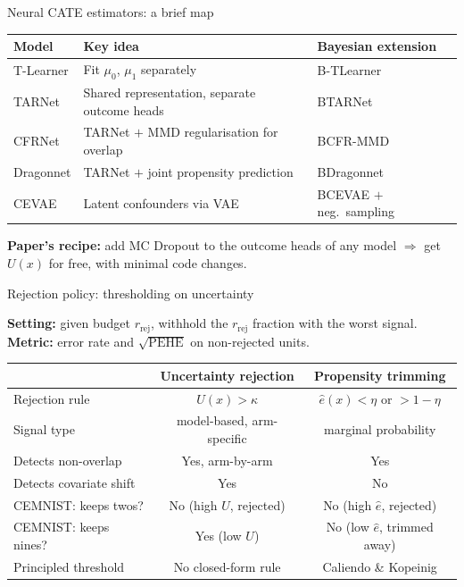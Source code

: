 \documentclass[aspectratio=169]{beamer}
\begin{document}
\begin{frame}{Neural CATE estimators: a brief map}

\begin{center}
\small
\renewcommand{\arraystretch}{1.3}
\begin{tabular}{lll}
\toprule
Model      & Key idea                                        & Bayesian extension \\
\midrule
T-Learner  & Fit $\mu_0$, $\mu_1$ separately                 & B-TLearner \\
TARNet     & Shared representation, separate outcome heads   & BTARNet \\
CFRNet     & TARNet $+$ MMD regularisation for overlap       & BCFR-MMD \\
Dragonnet  & TARNet $+$ joint propensity prediction          & BDragonnet \\
CEVAE      & Latent confounders via VAE                      & BCEVAE $+$ neg.\ sampling \\
\bottomrule
\end{tabular}
\end{center}

\bigskip
\textbf{Paper's recipe:} add MC Dropout to the outcome heads of any model
$\Rightarrow$ get $U(x)$ for free, with minimal code changes.
\end{frame}

\begin{frame}{Rejection policy: thresholding on uncertainty}

\textbf{Setting:} given budget $r_{\mathrm{rej}}$, withhold the
$r_{\mathrm{rej}}$ fraction with the worst signal.
\textbf{Metric:} error rate and $\sqrt{\mathrm{PEHE}}$ on non-rejected units.

\medskip
\begin{center}
\small
\renewcommand{\arraystretch}{1.35}
\begin{tabular}{p{4.2cm}cc}
\toprule
 & \textbf{Uncertainty rejection} & \textbf{Propensity trimming} \\
\midrule
Rejection rule
  & $U(x) > \kappa$
  & $\hat e(x) < \eta$ or $> 1{-}\eta$ \\
Signal type
  & model-based, arm-specific
  & marginal probability \\
Detects non-overlap
  & \textcolor{green!60!black}{Yes, arm-by-arm}
  & \textcolor{green!60!black}{Yes} \\
Detects covariate shift
  & \textcolor{green!60!black}{Yes}
  & \alert{No} \\
CEMNIST: keeps twos?
  & \alert{No} (high $U$, rejected)
  & \alert{No} (high $\hat e$, rejected) \\
CEMNIST: keeps nines?
  & \textcolor{green!60!black}{Yes} (low $U$)
  & \alert{No} (low $\hat e$, trimmed away) \\
Principled threshold
  & No closed-form rule
  & Caliendo \& Kopeinig \\
\bottomrule
\end{tabular}
\end{center}
\end{frame}
\end{document}
